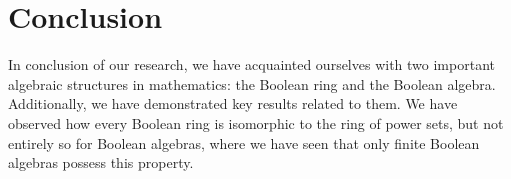 \chapter*{Conclusion}
In conclusion of our research, we have acquainted ourselves with two important algebraic structures in mathematics: the Boolean ring and the Boolean algebra. Additionally, we have demonstrated key results related to them. We have observed how every Boolean ring is isomorphic to the ring of power sets, but not entirely so for Boolean algebras, where we have seen that only finite Boolean algebras possess this property.